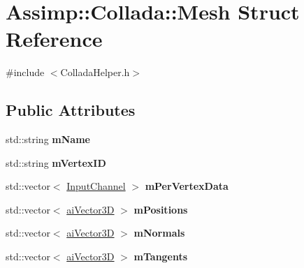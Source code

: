 \hypertarget{struct_assimp_1_1_collada_1_1_mesh}{\section{Assimp\+:\+:Collada\+:\+:Mesh Struct Reference}
\label{struct_assimp_1_1_collada_1_1_mesh}
}


{\ttfamily \#include $<$Collada\+Helper.\+h$>$}

\subsection*{Public Attributes}
\begin{DoxyCompactItemize}
\item 
\hypertarget{struct_assimp_1_1_collada_1_1_mesh_a9afb8e386e46a681e1f519aeb37a57a4}{std\+::string {\bfseries m\+Name}}\label{struct_assimp_1_1_collada_1_1_mesh_a9afb8e386e46a681e1f519aeb37a57a4}

\item 
\hypertarget{struct_assimp_1_1_collada_1_1_mesh_a2f6296f10056db15a8fa893fbede7952}{std\+::string {\bfseries m\+Vertex\+I\+D}}\label{struct_assimp_1_1_collada_1_1_mesh_a2f6296f10056db15a8fa893fbede7952}

\item 
\hypertarget{struct_assimp_1_1_collada_1_1_mesh_a7401529c07a3f98b6e57765b74daaac2}{std\+::vector$<$ \hyperlink{struct_assimp_1_1_collada_1_1_input_channel}{Input\+Channel} $>$ {\bfseries m\+Per\+Vertex\+Data}}\label{struct_assimp_1_1_collada_1_1_mesh_a7401529c07a3f98b6e57765b74daaac2}

\item 
\hypertarget{struct_assimp_1_1_collada_1_1_mesh_a650c67fff1e8e7e200fa802dcb84e627}{std\+::vector$<$ \hyperlink{structai_vector3_d}{ai\+Vector3\+D} $>$ {\bfseries m\+Positions}}\label{struct_assimp_1_1_collada_1_1_mesh_a650c67fff1e8e7e200fa802dcb84e627}

\item 
\hypertarget{struct_assimp_1_1_collada_1_1_mesh_a69dbc553c4872066ae4a5068b2a58052}{std\+::vector$<$ \hyperlink{structai_vector3_d}{ai\+Vector3\+D} $>$ {\bfseries m\+Normals}}\label{struct_assimp_1_1_collada_1_1_mesh_a69dbc553c4872066ae4a5068b2a58052}

\item 
\hypertarget{struct_assimp_1_1_collada_1_1_mesh_a6a3ce06bba929adeaf97d22d4a48dc9c}{std\+::vector$<$ \hyperlink{structai_vector3_d}{ai\+Vector3\+D} $>$ {\bfseries m\+Tangents}}\label{struct_assimp_1_1_collada_1_1_mesh_a6a3ce06bba929adeaf97d22d4a48dc9c}


\end{DoxyCompactItemize}
